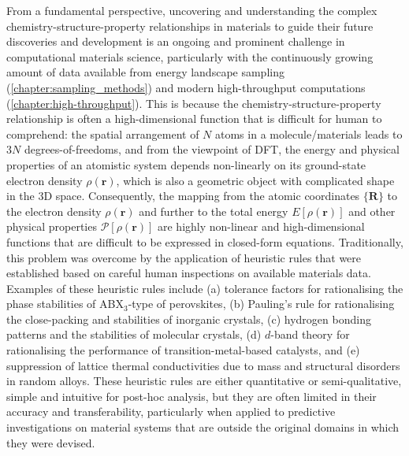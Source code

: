 From a fundamental perspective, uncovering and understanding the complex chemistry-structure-property relationships in materials to guide their future discoveries and development is an ongoing and prominent challenge in computational materials science, particularly with the continuously growing amount of data available from energy landscape sampling (\cref{chapter:sampling_methods}) and modern high-throughput computations (\cref{chapter:high-throughput}). This is because the  chemistry-structure-property relationship is often a high-dimensional function that is difficult for human to comprehend: the spatial arrangement of $N$ atoms in a molecule/materials leads to $3N$ degrees-of-freedoms, and from the viewpoint of DFT, the energy and physical properties of an atomistic system depends non-linearly on its ground-state electron density $\rho(\bm{r})$, which is also a geometric object with complicated shape in the 3D space. Consequently, the mapping from the atomic coordinates $\{\bm{R}\}$ to the electron density $\rho(\bm{r})$ and further to the total energy $E[\rho(\bm{r})]$ and other physical properties $\mathcal{P}[\rho(\bm{r})]$ are highly non-linear and high-dimensional functions that are difficult to be expressed in closed-form equations. Traditionally, this problem was overcome by the application of heuristic rules that were established based on careful human inspections on available materials data. Examples of these heuristic rules include (a) tolerance factors for rationalising the phase stabilities of ABX$_3$-type of perovskites,\cite{Goldschmidt1926_Krystallochemie,Shannon1976_IonicRadii,Bartel2019_NewToleranceFactor} (b) Pauling's rule for rationalising the close-packing and stabilities of inorganic crystals, (c) hydrogen bonding patterns and the stabilities of molecular crystals,\cite{gavezzotti2007molecular}   (d) $d$-band theory for rationalising the performance of transition-metal-based catalysts,\cite{Hammer1995_Nature_dband} and (e) suppression of lattice thermal conductivities due to mass and structural disorders in random alloys.\cite{Abeles1963_AlloyThermalConductivity} These heuristic rules are either quantitative or semi-qualitative, simple and intuitive for post-hoc analysis, but they are often limited in their accuracy and transferability, particularly when applied to predictive investigations on material systems that are outside the original domains in which they were devised. 

